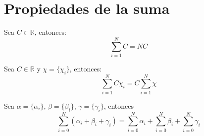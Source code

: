 \section{Propiedades de la suma}
\begin{propiedad}
    Sea $C\in \mathbb{R}$, entonces:
    \begin{equation}
        \sum_{i=1}^N C = NC
    \end{equation}
\end{propiedad}
\begin{propiedad}
    Sea $C\in \mathbb{R}$ y $\chi = \{\chi_i\}$, entonces:
    \begin{equation}
        \sum_{i=1}^N C\chi_i = C \sum_{i=1}^N \chi
    \end{equation}
\end{propiedad}
\begin{propiedad}
    Sea $\alpha = \{\alpha_i\}$, $\beta = \{\beta_i\}$, $\gamma = \{\gamma_i\}$, entonces
    \begin{equation}
        \sum_{i=0}^N \left(\alpha_i + \beta_i + \gamma_i \right) =
        \sum_{i=0}^N \alpha_i + \sum_{i=0}^N \beta_i  +\sum_{i=0}^N \gamma_i
    \end{equation}
\end{propiedad}